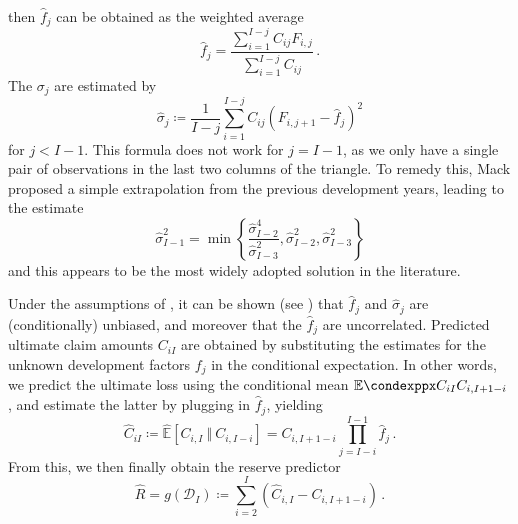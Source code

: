 \documentclass[a4paper]{book}
\begin{document}
then $\widehat{f}_j$ can be obtained as the weighted average
\begin{equation}
  \widehat{f}_j = \frac{\sum_{i = 1}^{I - j} C_{ij} F_{i, j}}{\sum_{i = 1}^{I - j} C_{ij}} \,.
\end{equation}
The $\sigma_j$ are estimated by
\begin{equation}
    \widehat{\sigma}_j \coloneqq \frac{1}{I-j}\sum_{i = 1}^{I-j} C_{ij}\left( F_{i, j + 1} - \widehat{f}_j \right)^2
\end{equation}
for $j < I - 1$. This formula does not work for $j = I - 1$, as we only have a single pair of observations in the last two columns of the triangle. To remedy this, Mack proposed a simple extrapolation from the previous development years, leading to the estimate
\begin{equation}
  \widehat{\sigma}^2_{I - 1} = \min{ \left \{ \frac{\widehat{\sigma}^4_{I - 2}}{\widehat{\sigma}^2_{I - 3}}, \widehat{\sigma}^2_{I - 2}, \widehat{\sigma}^2_{I - 3} \right \} }
\end{equation}
and this appears to be the most widely adopted solution in the literature.

Under the assumptions of , it can be shown (see \cite[17 \psqq]{wuthrich:stochastic-reserving}) that $\widehat{f}_j$ and $\widehat{\sigma}_j$ are (conditionally) unbiased, and moreover that the $\widehat{f}_j$ are uncorrelated. Predicted ultimate claim amounts $C_{iI}$ are obtained by substituting the estimates for the unknown development factors $f_j$ in the conditional expectation. In other words, we predict the ultimate loss using the conditional mean $\condexpp{C_{iI}}{C_{i, I + 1 - i}}$, and estimate the latter by plugging in $\widehat{f}_j$, yielding
\begin{equation}
    \widehat{C}_{iI} \coloneqq \widehat{\mathbb{E}}[C_{i, I} \ \Vert \ C_{i, I - i}] = C_{i, I + 1 - i} \prod_{j = I - i}^{I-1} \widehat{f}_j \,.
\end{equation}
From this, we then finally obtain the reserve predictor
\begin{equation} \label{eq:reserve-predictor}
    \widehat{R} = g(\mathcal{D}_I) \coloneqq \sum_{i = 2}^I (\widehat{C}_{i, I} - C_{i, I + 1- i}) \,. 
\end{equation}
\end{document}
